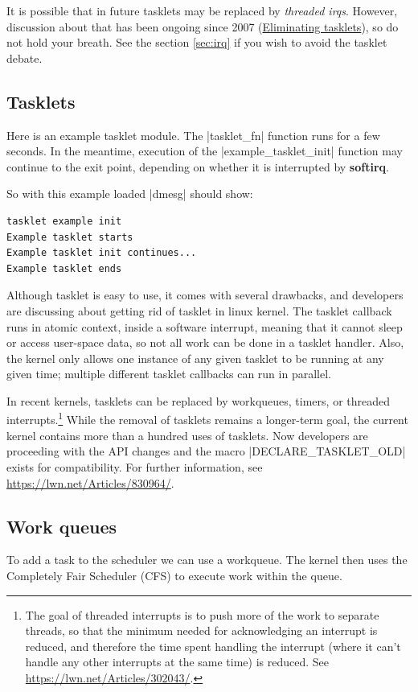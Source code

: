 \documentclass[10pt, oneside]{book}
\begin{document}
It is possible that in future tasklets may be replaced by \textit{threaded irqs}.
However, discussion about that has been ongoing since 2007 (\href{https://lwn.net/Articles/239633}{Eliminating tasklets}), so do not hold your breath.
See the section \ref{sec:irq} if you wish to avoid the tasklet debate.

\subsection{Tasklets}
\label{sec:tasklet}
Here is an example tasklet module.
The \cpp|tasklet_fn| function runs for a few seconds.
In the meantime, execution of the \cpp|example_tasklet_init| function may continue to the exit point, depending on whether it is interrupted by \textbf{softirq}.


So with this example loaded \sh|dmesg| should show:

\begin{verbatim}
tasklet example init
Example tasklet starts
Example tasklet init continues...
Example tasklet ends
\end{verbatim}
Although tasklet is easy to use, it comes with several drawbacks, and developers are discussing about getting rid of tasklet in linux kernel.
The tasklet callback runs in atomic context, inside a software interrupt, meaning that it cannot sleep or access user-space data, so not all work can be done in a tasklet handler.
Also, the kernel only allows one instance of any given tasklet to be running at any given time; multiple different tasklet callbacks can run in parallel.

In recent kernels, tasklets can be replaced by workqueues, timers, or threaded interrupts.\footnote{The goal of threaded interrupts is to push more of the work to separate threads, so that the minimum needed for acknowledging an interrupt is reduced, and therefore the time spent handling the interrupt (where it can't handle any other interrupts at the same time) is reduced.
See \url{https://lwn.net/Articles/302043/}.}
While the removal of tasklets remains a longer-term goal, the current kernel contains more than a hundred uses of tasklets.
Now developers are proceeding with the API changes and the macro \cpp|DECLARE_TASKLET_OLD| exists for compatibility.
For further information, see \url{https://lwn.net/Articles/830964/}.

\subsection{Work queues}
\label{sec:workqueue}
To add a task to the scheduler we can use a workqueue.
The kernel then uses the Completely Fair Scheduler (CFS) to execute work within the queue.
\end{document}
